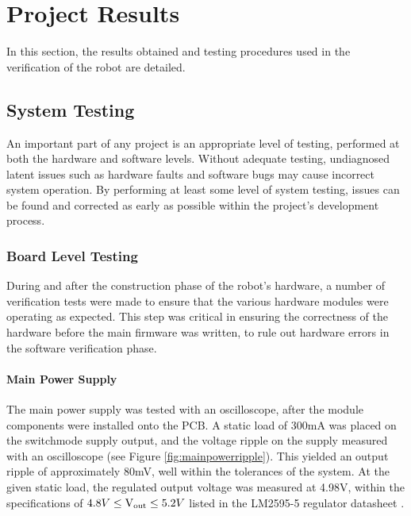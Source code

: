 \chapter{Project Results}
\label{chp:results}

In this section, the results obtained and testing procedures used in the verification of the robot are detailed.

\section{System Testing}

An important part of any project is an appropriate level of testing, performed at both the hardware and software levels. Without adequate testing, undiagnosed latent issues such as hardware faults and software bugs may cause incorrect system operation. By performing at least some level of system testing, issues can be found and corrected as early as possible within the project's development process.

\FloatBarrier
\subsection{Board Level Testing}

During and after the construction phase of the robot's hardware, a number of verification tests were made to ensure that the various hardware modules were operating as expected. This step was critical in ensuring the correctness of the hardware before the main firmware was written, to rule out hardware errors in the software verification phase.

\FloatBarrier
\subsubsection{Main Power Supply}

The main power supply was tested with an oscilloscope, after the module components were installed onto the PCB. A static load of 300mA was placed on the switchmode supply output, and the voltage ripple on the supply measured with an oscilloscope (see Figure \ref{fig:mainpowerripple}). This yielded an output ripple of approximately 80mV, well within the tolerances of the system. At the given static load, the regulated output voltage was measured at 4.98V, within the specifications of \(4.8V\leq\text{V\ensuremath{_{\textrm{out}}}}\leq5.2V\) listed in the LM2595-5 regulator datasheet \cite{lm2595}.

